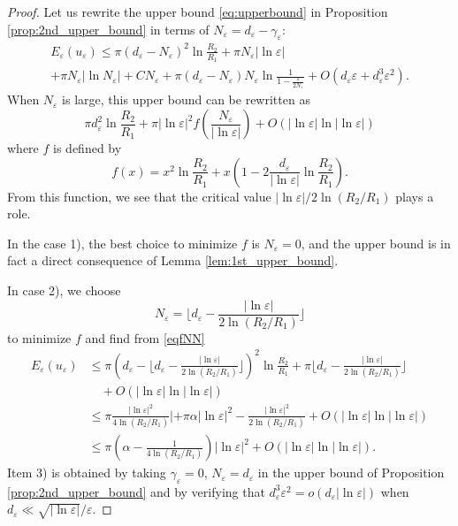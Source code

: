\documentclass[12pt,reqno]{amsart}
\def\e {{\varepsilon}}
\numberwithin{equation}{section}
\begin{document}
\begin{proof} Let us rewrite the upper bound 
 \eqref{eq:upperbound} in Proposition \ref{prop:2nd_upper_bound} in terms of \(N_\e=d_\e-\gamma_\e\):
\begin{multline}\label{eq:upper_intermediate}
E_\e(u_\e)\leq \pi (d_\e-N_\e)^2 \ln \frac{R_2}{R_1}+\pi N_\e|\ln \e| \\
 +\pi N_\e |\ln N_\e|+CN_\e+\pi (d_\e-N_\e)N_\e \ln \frac{1}{1-\frac{\pi}{2N_\e}}+O(d_\e\e+d_\e^3\e^2). 
\end{multline} When \(N_\e\) is large, this upper bound can be rewritten as
\begin{equation}\label{eqfNN}\pi d_\e^2 \ln \frac{R_2}{R_1} +\pi |\ln \e|^2 f\left (\frac {N_\e}{|\ln \e|} \right ) +O(|\ln \e| \ln |\ln \e|)\end{equation} where $f$ is defined by
\begin{equation}\label{eqfN}
f(x)=x^2\ln \frac{R_2}{R_1}+x\left (1-2\frac{d_\e}{|\ln \e|}\ln \frac{R_2}{R_1}\right).
\end{equation}From this function, we see that the critical value $|\ln \e|/2\ln (R_2/R_1)$ plays a role.

In the case 1), the best choice to minimize $f$ is $N_\e=0$, and the upper bound  is in fact a direct consequence of Lemma \ref{lem:1st_upper_bound}. 

In case 2), we choose  \[N_\e= \lfloor d_\e -\frac{|\ln \e|}{2\ln (R_2/R_1)}\rfloor\] to minimize $f$ and find from \eqref{eqfNN}
\begin{align*}
E_\e(u_\e) & \leq \pi \left( d_\e- \lfloor d_\e-\frac{|\ln \e|}{2 \ln (R_2/R_1)} \rfloor \right)^2\ln \frac{R_2}{R_1}+\pi \lfloor d_\e-\frac{|\ln \e|}{2\ln (R_2/R_1)}\rfloor  \\
& \quad +O(|\ln \e| \ln |\ln \e|) \\
& \leq \pi \frac{|\ln \e|^2}{4\ln(R_2/R_1)}|+\pi \alpha |\ln \e|^2-\frac{|\ln \e|^2}{2\ln (R_2/R_1)}+O(|\ln \e| \ln |\ln \e|) \\
 & \leq \pi (\alpha-\frac{1}{4 \ln (R_2/R_1)})|\ln \e|^2+O(|\ln \e| \ln |\ln \e|).
\end{align*}
Item 3) is obtained by taking $\gamma_\e=0$, \(N_\e=d_\e\) in the upper bound of Proposition \ref{prop:2nd_upper_bound} and by verifying that \(d_\e^3\e^2=o(d_\e|\ln \e|)\) when \(d_\e \ll \sqrt{|\ln \e|}/\e\).
\end{proof}
\end{document}
